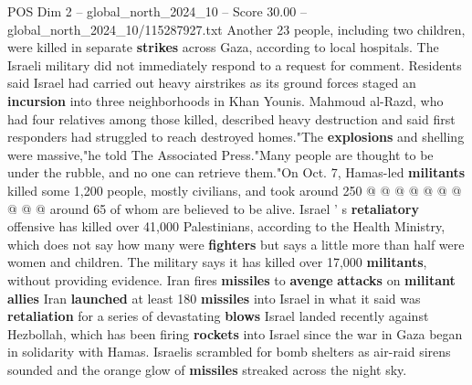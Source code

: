 \begin{textsample}{POS Dim 2 – global\_north\_2024\_10 – Score 30.00 – global\_north\_2024\_10/115287927.txt}
Another 23 people, including two children, were killed in separate \textbf{strikes} across Gaza, according to local hospitals.
The Israeli military did not immediately respond to a request for comment.
Residents said Israel had carried out heavy airstrikes as its ground forces staged an \textbf{incursion} into three neighborhoods in Khan Younis.
Mahmoud al-Razd, who had four relatives among those killed, described heavy destruction and said first responders had struggled to reach destroyed homes."The \textbf{explosions} and shelling were massive,"he told The Associated Press."Many people are thought to be under the rubble, and no one can retrieve them."On Oct. 7, Hamas-led \textbf{militants} killed some 1,200 people, mostly civilians, and took around 250 @ @ @ @ @ @ @ @ @ @ around 65 of whom are believed to be alive.
Israel ' s \textbf{retaliatory} offensive has killed over 41,000 Palestinians, according to the Health Ministry, which does not say how many were \textbf{fighters} but says a little more than half were women and children.
The military says it has killed over 17,000 \textbf{militants}, without providing evidence.
Iran fires \textbf{missiles} to \textbf{avenge} \textbf{attacks} on \textbf{militant} \textbf{allies} Iran \textbf{launched} at least 180 \textbf{missiles} into Israel in what it said was \textbf{retaliation} for a series of devastating \textbf{blows} Israel landed recently against Hezbollah, which has been firing \textbf{rockets} into Israel since the war in Gaza began in solidarity with Hamas.
Israelis scrambled for bomb shelters as air-raid sirens sounded and the orange glow of \textbf{missiles} streaked across the night sky.

\end{textsample}
